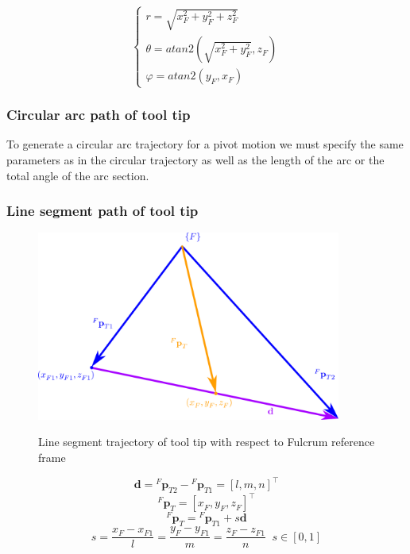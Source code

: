 \begin{equation}
\label{eqns:cartesian-to-spherical}
\begin{cases}
r = \sqrt{x^{2}_{F} + y^{2}_{F} + z^{2}_{F}} \\
θ = atan2 \left( \sqrt{x^{2}_{F} + y^{2}_{F}}, z^{}_{F} \right) \\
φ = atan2(y^{}_{F}, x^{}_{F})
\end{cases}
\end{equation}

\subsubsection{Circular arc path of tool tip}

To generate a circular arc trajectory for a pivot motion we must specify the same parameters as 
in the circular trajectory as well as the length of the arc or the total angle of the arc 
section.


\subsubsection{Line segment path of tool tip}

\begin{center}
\begin{figure}[H]
\centering
\includegraphics[width=10cm]{images/line-segment-trajectory-wrt-fulcrum.png}\\
\caption{Line segment trajectory of tool tip with respect to Fulcrum reference frame}
\end{figure}
\end{center}
\[
\mathbf{d} = {}^{F}\mathbf{p}^{}_{T2} - {}^{F}\mathbf{p}^{}_{T1} = [l, m, n]^\top
\]
\[
{}^{F}\mathbf{p}^{}_{T} = [x^{}_{F}, y^{}_{F}, z^{}_{F}]^\top
\]
\[
{}^{F}\mathbf{p}^{}_{T} = {}^{F}\mathbf{p}^{}_{T1} + s\mathbf{d}
\]
\[
s = \frac{x^{}_{F} - x^{}_{F1}}{l} = \frac{y^{}_{F} - y^{}_{F1}}{m} = \frac{z^{}_{F} - z^{}_{F1}}{n} \;\; s \in [0, 1]
\]

